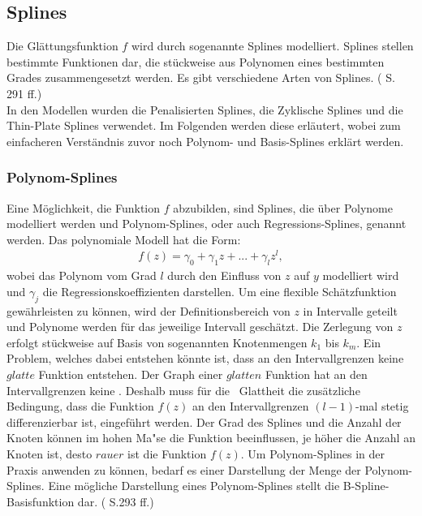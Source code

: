 \documentclass[12pt]{scrreprt}
\begin{document}
\subsection{Splines}
Die Glättungsfunktion $f$ wird durch sogenannte Splines modelliert. Splines stellen bestimmte Funktionen dar, die stückweise aus Polynomen eines bestimmten Grades zusammengesetzt werden. Es gibt verschiedene Arten von Splines. (\cite{fahrmeir2007regression} S. 291 ff.) \\
In den Modellen wurden die Penalisierten Splines, die Zyklische Splines und die Thin-Plate Splines verwendet. Im Folgenden werden diese erläutert, wobei zum einfacheren Verständnis zuvor noch Polynom- und Basis-Splines erklärt werden.

\subsubsection{Polynom-Splines}
Eine Möglichkeit, die Funktion $f$ abzubilden, sind Splines, die über Polynome modelliert werden und Polynom-Splines, oder auch Regressions-Splines, genannt werden. Das polynomiale Modell hat die Form: 
\begin{align}
f(z)=\gamma_{0}+\gamma_{1}z+...+\gamma_{l}z^l,
\end{align}
wobei das Polynom vom Grad $l$ durch den Einfluss von $z$ auf $y$ modelliert wird und $\gamma_{j}$ die Regressionskoeffizienten darstellen. Um eine flexible Schätzfunktion gewährleisten zu können, wird der Definitionsbereich von $z$ in Intervalle geteilt und Polynome werden für das jeweilige Intervall geschätzt. Die Zerlegung von $z$ erfolgt stückweise auf Basis von sogenannten Knotenmengen $k_{1}$ bis $k_{m}$.  Ein Problem, welches dabei entstehen könnte ist, dass an den Intervallgrenzen keine $glatte$ Funktion entstehen. Der Graph einer $glatten$ Funktion hat an den Intervallgrenzen keine . Deshalb muss für die \grqq ~Glattheit die zusätzliche Bedingung, dass die Funktion $f(z)$ an den Intervallgrenzen $(l-1)$-mal stetig differenzierbar ist, eingeführt werden. Der Grad des Splines und die Anzahl der Knoten können im hohen Ma"se die Funktion beeinflussen, je höher die Anzahl an Knoten ist, desto $rauer$ ist die Funktion $f(z)$. Um Polynom-Splines in der Praxis anwenden zu können, bedarf es einer Darstellung der Menge der Polynom-Splines. Eine mögliche Darstellung eines Polynom-Splines stellt die B-Spline-Basisfunktion dar. (\cite{fahrmeir2007regression} S.293 ff.)
\end{document}
